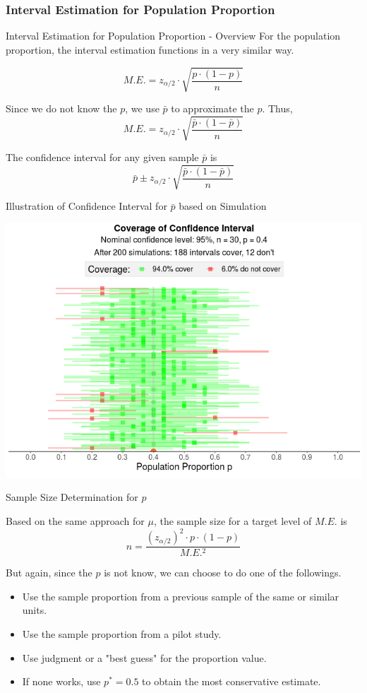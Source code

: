 \documentclass{beamer}
\begin{document}
\subsubsection{Interval Estimation for Population Proportion}

\begin{frame}{Interval Estimation for Population Proportion - Overview}
For the population proportion, the interval estimation functions in a very similar way. 

$$M.E. = z_{\alpha/2} \cdot \sqrt{\frac{p\cdot(1-p)}{n}}$$ 

Since we do not know the $p$, we use $\bar{p}$ to approximate the $p$. Thus, 
$$M.E. = z_{\alpha/2} \cdot \sqrt{\frac{\bar{p}\cdot(1-\bar{p})}{n}}$$ 

The confidence interval for any given sample $\bar{p}$ is
$$\bar{p} \pm z_{\alpha/2} \cdot \sqrt{\frac{\bar{p}\cdot(1-\bar{p})}{n}} $$

\end{frame}


\begin{frame}{Illustration of Confidence Interval for $\bar{p}$ based on Simulation}

\begin{center}
\includegraphics[width = 250 px]{images/section5ConfidenceIntervalP.png}
\end{center}

\end{frame}



\begin{frame}{Sample Size Determination for $p$}

Based on the same approach for $\mu$, the sample size for a target level of $M.E.$ is 
$$n = \frac{(z_{\alpha/2})^2\cdot p \cdot (1-p)}{M.E.^2}$$

But again, since the $p$ is not know, we can choose to do one of the followings.
\begin{itemize}
\item Use the sample proportion from a previous sample of the same or similar units.
\item Use the sample proportion from a pilot study.
\item Use judgment or a "best guess" for the proportion value. 
\item If none works, use $p^* = 0.5$ to obtain the most conservative estimate. 
\end{itemize}

\end{frame}
\end{document}
